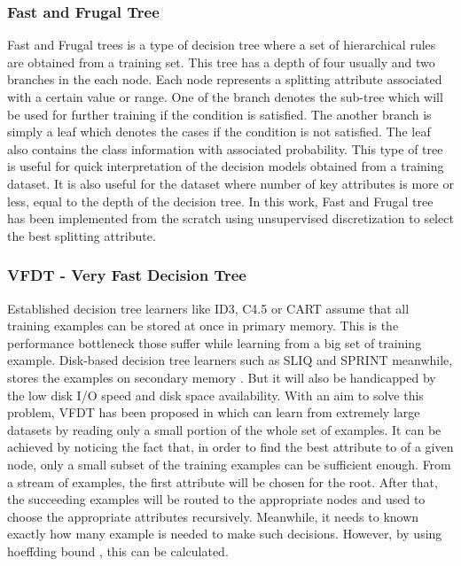 \documentclass[sigplan]{acmart}\settopmatter{printfolios=true,printccs=false,printacmref=false}
\begin{document}
\subsubsection{Fast and Frugal Tree}
Fast and Frugal trees is a type of decision tree where a set of hierarchical rules are obtained from a training set. This tree has a depth of four usually and two branches in the each node. Each node represents a splitting attribute associated with a certain value or range. One of the branch denotes the sub-tree which will be used for further training if the condition is satisfied. The another branch is simply a leaf which denotes the cases if the condition is not satisfied. The leaf also contains the class information with associated probability. This type of tree is useful for quick interpretation of the decision models obtained from a training dataset. It is also useful for the dataset where number of key attributes is more or less, equal to the depth of the decision tree. In this work, Fast and Frugal tree has been implemented from the scratch \cite{ncsufss18} using unsupervised discretization to select the best splitting attribute. 

\subsubsection{VFDT - Very Fast Decision Tree}
Established decision tree learners like ID3, C4.5 or CART assume that all training examples can be stored at once in primary memory. This is the performance bottleneck those suffer while learning from a big set of training example. Disk-based decision tree learners such as SLIQ and SPRINT meanwhile, stores the examples on secondary memory \cite{mehta1996sliq, quinlan1995oversearching}. But it will also be handicapped by the low disk I/O speed and disk space availability. With an aim to solve this problem, VFDT has been proposed in \cite{domingos2000mining} which can learn from extremely large datasets by reading only a small portion of the whole set of examples. It can be achieved by noticing the fact that, in order to find the best attribute to of a given node, only a small subset of the training examples can be sufficient enough. From a stream of examples, the first attribute will be chosen for the root. After that, the succeeding examples will be routed to the appropriate nodes and used to choose the appropriate attributes recursively. Meanwhile, it needs to known exactly how many example is needed to make such decisions. However, by using hoeffding bound \cite{hoeffding1963probability}, this can be calculated.
\end{document}
